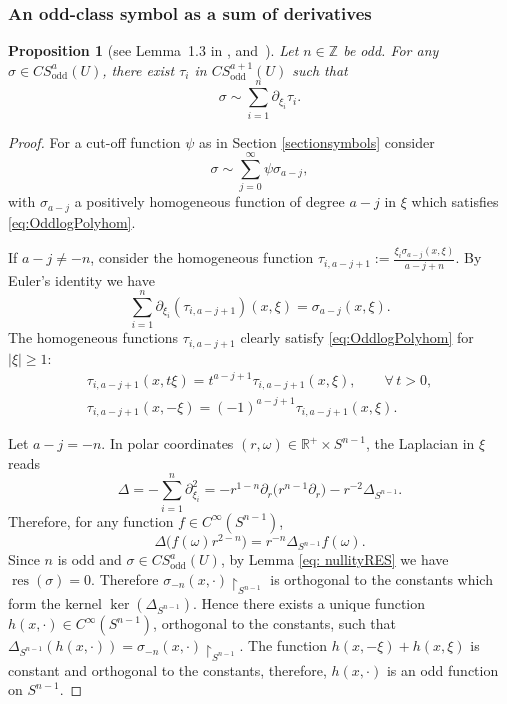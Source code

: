 \documentclass[11pt]{article}
\newtheorem{proposition}{Proposition}
\DeclareMathOperator{\res}{res} \DeclareMathOperator{\Res}{Res}
\DeclareMathOperator{\odd}{odd} \DeclareMathOperator{\supp}{supp}
\newcommand{\Z}{{\mathbb Z}}
\begin{document}
\subsubsection{An odd-class symbol as a sum of derivatives}

\begin{proposition}[see Lemma~1.3 in \cite{fedosov}, and~\cite{maniccia}]\label{prop:SymbolSumDerivatives}
Let $n\in\Z$ be odd. For any $\sigma\in CS_{\odd}^a(U)$, there exist $\tau_i$ in $CS_{\odd}^{a+1}(U)$ such that
\[
\sigma\sim\sum\limits_{i=1}^n\partial_{\xi_i}\tau_i.
\]
\end{proposition}

\begin{proof}
For a cut-of\/f function $\psi$ as in Section \ref{sectionsymbols} consider
\[
\sigma\sim\sum_{j=0}^\infty\psi \sigma_{a-j},
\]
with $\sigma_{a-j}$ a positively homogeneous function of degree $a-j$ in $\xi$ which satisf\/ies \eqref{eq:OddlogPolyhom}.

 If $a-j\not=-n$, consider the homogeneous function $\tau_{i,a-j+1}:=\frac{\xi_i\sigma_{a-j}(x,\xi)}{a-j+n}$. By Euler's identity we have
\[
\sum_{i=1}^n\partial_{\xi_i}(\tau_{i,a-j+1})(x,\xi)=\sigma_{a-j}(x,\xi).
\]
The homogeneous functions $\tau_{i,a-j+1}$ clearly satisfy \eqref{eq:OddlogPolyhom} for $|\xi|\geq1$:
\begin{gather*}
\tau_{i,a-j+1}(x,t\xi) =t^{a-j+1}\tau_{i,a-j+1}(x,\xi),\qquad \forall\, t>0,\\
\tau_{i,a-j+1}(x,-\xi) =(-1)^{a-j+1}\tau_{i,a-j+1}(x,\xi).
\end{gather*}

 Let $a-j=-n$. In polar coordinates $(r,\omega)\in\mathbb{R}^+\times S^{n-1}$, the Laplacian in $\xi$ reads
\[
\Delta=-\sum_{i=1}^n\partial_{\xi_i}^2=-r^{1-n}\partial_r\big(r^{n-1}\partial_r\big)-r^{-2}\Delta_{S^{n-1}}.
\]
Therefore, for any function $f\in C^\infty(S^{n-1})$,
\[
\Delta\big(f(\omega)r^{2-n}\big)=r^{-n}\Delta_{S^{n-1}}f(\omega).
\]
Since $n$ is odd and $\sigma\in CS_{\odd}^a(U)$, by Lemma \ref{eq: nullityRES} we have $\res(\sigma)=0$. Therefore $\sigma_{-n}(x,\cdot)\upharpoonright_{S^{n-1}}$ is orthogonal to the constants which form the kernel $\ker(\Delta_{S^{n-1}})$. Hence there exists a unique function $h(x,\cdot)\in C^\infty(S^{n-1})$, orthogonal to the constants, such that $\Delta_{S^{n-1}}(h(x,\cdot))=\sigma_{-n}(x,\cdot)\upharpoonright_{S^{n-1}}$. The function $h(x,-\xi)+h(x,\xi)$ is constant and orthogonal to the constants, therefore, $h(x,\cdot)$ is an odd function on $S^{n-1}$.


\end{proof}
\end{document}

